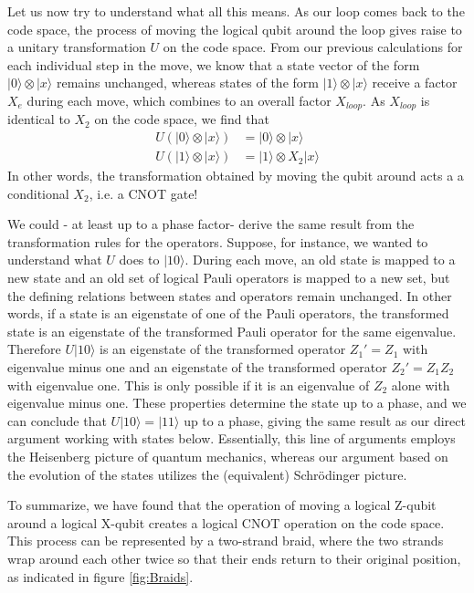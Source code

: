 \documentclass[a4paper, draft]{article}
\theoremstyle{own}
\theoremstyle{remark}
\begin{document}
Let us now try to understand what all this means. As our loop comes back to the code space, the process of moving the logical qubit around the loop gives raise to a unitary transformation $U$ on the code space. From our previous calculations for each individual step in the move, we know that a state vector of the form $|0 \rangle \otimes |x \rangle$ remains unchanged, whereas states of the form $|1 \rangle \otimes |x \rangle$ receive a factor $X_e$ during each move, which combines to an overall factor $X_{loop}$. As $X_{loop}$ is identical to $X_2$ on the code space, we find that
\begin{align*}
U(|0 \rangle \otimes |x \rangle) &= |0 \rangle \otimes |x \rangle \\
U(|1 \rangle \otimes |x \rangle) &= |1 \rangle \otimes X_2 |x \rangle 
\end{align*}
In other words, the transformation obtained by moving the qubit around acts a a conditional $X_2$, i.e. a CNOT gate!

We could - at least up to a phase factor- derive the same result from the transformation rules for the operators. Suppose, for instance, we wanted to understand what $U$ does to $|10\rangle$. During each move, an old state is mapped to a new state and an old set of logical Pauli operators is mapped to a new set, but the defining relations between states and operators remain unchanged. In other words, if a state is an eigenstate of one of the Pauli operators, the transformed state is an eigenstate of the transformed Pauli operator for the same eigenvalue. Therefore $U|10 \rangle$ is an eigenstate of the transformed operator $Z_1' = Z_1$ with eigenvalue minus one and an eigenstate of the transformed operator $Z_2' = Z_1 Z_2$ with eigenvalue one. This is only possible if it is an eigenvalue of $Z_2$ alone with eigenvalue minus one. These properties determine the state up to a phase, and we can conclude that $U|10 \rangle = |11 \rangle$ up to a phase, giving the same result as our direct argument working with states below. Essentially, this line of arguments employs the Heisenberg picture of quantum mechanics, whereas our argument based on the evolution of the states utilizes the (equivalent) Schr\"odinger picture.


To summarize, we have found that the operation of moving a logical Z-qubit around a logical X-qubit creates a logical CNOT operation on the code space. This process can be represented by a two-strand braid, where the two strands wrap around each other twice so that their ends return to their original position, as indicated in figure \ref{fig:Braids}.
\end{document}
